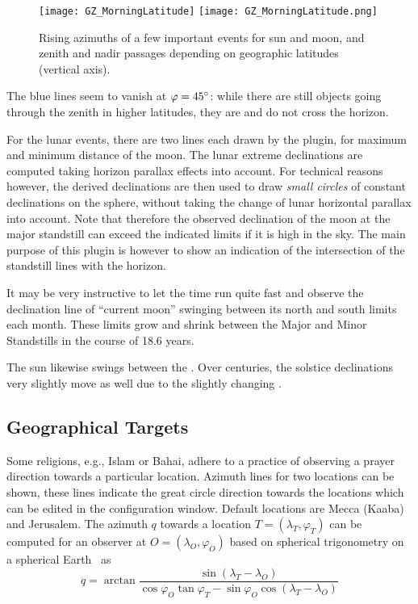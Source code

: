 \begin{figure}[t]
\ifpdf
\texttt{[image: GZ\_MorningLatitude]}
\else
\texttt{[image: GZ\_MorningLatitude.png]}
\fi
\caption{Rising azimuths of a few important events for sun and moon,
  and zenith and nadir passages depending on geographic latitudes
  (vertical axis).}
\label{fig:plugin:ArchaeoLines:MorningLatitudes}
\end{figure}

The blue lines seem to vanish at $\varphi=45\degree$: while there are
still objects going through the zenith in higher latitudes, they are
 and do not cross the horizon.

For the lunar events, there are two lines each drawn by the plugin,
for maximum and minimum distance of the moon.  The lunar extreme
declinations are computed taking horizon parallax effects into
account. For technical reasons however, the derived declinations are
then used to draw \emph{small circles} of constant declinations on the
sphere, without taking the change of lunar horizontal parallax into
account.  Note that therefore the observed declination of the moon at
the major standstill can exceed the indicated limits if it is high in
the sky. The main purpose of this plugin is however to show an
indication of the intersection of the standstill lines with the
horizon.

It may be very instructive to let the time run quite fast and observe
the declination line of ``current moon'' swinging between its north
and south limits each month.  These limits grow and shrink between the
Major and Minor Standstills in the course of 18.6 years.

The sun likewise swings between the . Over centuries, the
solstice declinations very slightly move as well due to the slightly
changing .

\subsection{Geographical Targets}
\label{sec:plugin:ArchaeoLines:GeographicalTargets}

Some religions, e.g., Islam or Bahai, adhere to a practice of
observing a prayer direction towards a particular location.  Azimuth
lines for two locations can be shown, these lines indicate the great
circle direction towards the locations which can be edited in the
configuration window. Default locations are Mecca (Kaaba) and
Jerusalem.  The azimuth $q$ towards a location $T=(\lambda_T,
\varphi_T)$ can be computed for an observer at $O=(\lambda_O, \varphi_O)$
based on spherical trigonometry on a spherical
Earth~\citep{Abdali:1997} as
\begin{equation}
  \label{eq:qibla}
  q=\arctan \frac{\sin (\lambda_{T} - \lambda_O) } { \cos\varphi_O \tan\varphi_T - \sin\varphi_O \cos(\lambda_{T} - \lambda_O) }
\end{equation}

